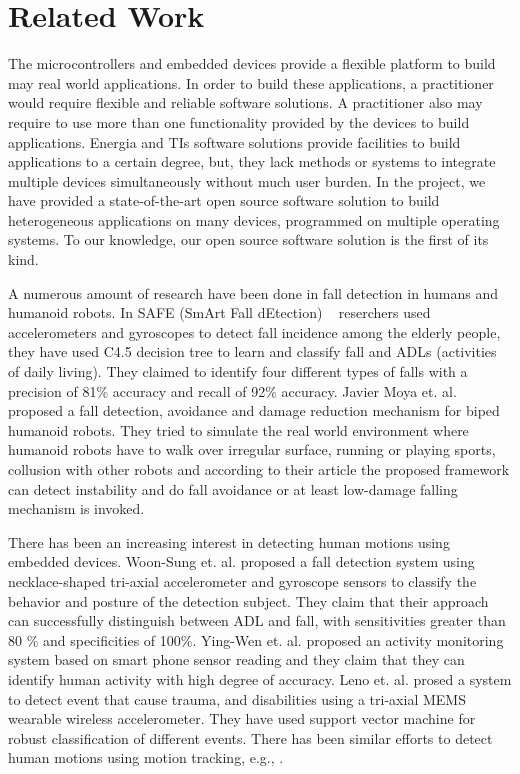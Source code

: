 \documentclass[letterpaper]{article}
\begin{document}
\section{Related Work}

The microcontrollers and embedded devices provide a flexible platform to build may real world
applications. In order to build these applications, a practitioner would require  flexible and
reliable software solutions. A practitioner also may require to use more than one functionality
provided by the devices to build applications. Energia and TIs software solutions provide
facilities to build applications to a certain degree, but, they lack methods or systems to integrate
multiple devices simultaneously without much user burden. In the project, we have provided a
state-of-the-art open source software solution to build heterogeneous applications on many devices,
programmed on multiple operating systems. To our knowledge, our open source software solution is the
first of its kind. 

A numerous amount of research have been done in fall detection in humans and humanoid robots. 
In SAFE (SmArt Fall dEtection) {~\cite{ojetola2011fall}} reserchers used accelerometers and 
gyroscopes 
to detect fall incidence among the elderly people, they have used C4.5 decision tree to learn and 
classify fall and ADLs (activities of daily living). They claimed to identify four different types 
of falls with a precision of 81\% accuracy and recall of 92\% accuracy.
Javier Moya et. al.{~\cite{moya2014fall}} proposed a fall detection, avoidance and damage reduction 
mechanism for biped humanoid robots. They tried to simulate the real world environment where 
humanoid robots have to walk over irregular surface, running or playing sports, collusion with other 
robots and according to their article the proposed framework can detect instability and do fall 
avoidance or at least low-damage falling mechanism is invoked. 

There has been an increasing interest in detecting human motions using embedded devices. Woon-Sung
et. al. \cite{baek2013real} proposed  a fall  detection  system  using necklace-shaped tri-axial
accelerometer  and  gyroscope  sensors  to  classify  the  behavior  and  posture  of  the detection
 subject. They claim that their  approach  can  successfully  distinguish between  ADL and  fall, 
with  sensitivities  greater  than  80 \%  and specificities  of  100\%. Ying-Wen et. al.
\cite{bai2013recognition} proposed an activity monitoring system based on smart phone sensor
reading and they claim that they can identify human activity with high degree of accuracy. Leno et.
al. \cite{leone2013supervised} prosed a system to detect event that cause trauma, and disabilities
using a tri-axial MEMS wearable wireless accelerometer. They have used support vector machine for
robust classification of different events. There has been similar efforts to detect human motions
using motion tracking, e.g., \cite{dumitrache2013fall,kumarwearable,liang2012pre}.
\end{document}
